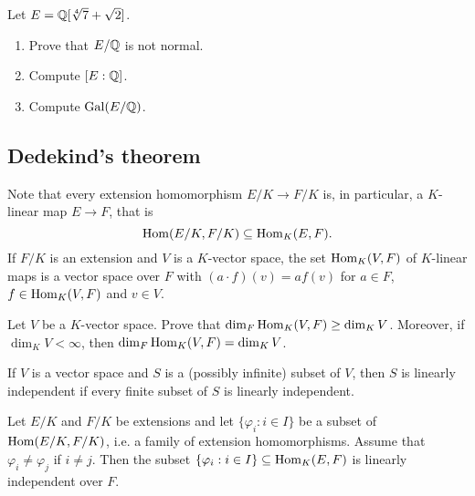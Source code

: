 \begin{exercise}
\label{xca:Q[sqrt[4]{7}+sqrt{2}]}
    Let $E=\mathbb{Q}[\sqrt[4]{7}+\sqrt{2}]$. 
    \begin{enumerate}
        \item Prove that $E/\mathbb{Q}$ is not normal. 
        \item Compute $[E:\mathbb{Q}]$.
        \item Compute $\operatorname{Gal}(E/\mathbb{Q})$. 
    \end{enumerate}
\end{exercise}


\subsection{Dedekind's theorem}

Note that every extension homomorphism $E/K\to F/K$ is, in particular, 
a $K$-linear map $E\to F$, that is
\[
\operatorname{Hom}(E/K,F/K)\subseteq\operatorname{Hom}_K(E,F).
\]
If $F/K$ is an extension and $V$ 
is a $K$-vector space, the set
$\operatorname{Hom}_K(V,F)$ of $K$-linear maps
is a vector space over $F$ with
$(a\cdot f)(v)=af(v)$ for $a\in F$, 
$f\in\operatorname{Hom}_K(V,F)$ and $v\in V$. 

\begin{exercise}
\label{xca:dim}
    Let $V$ be a $K$-vector space. 
    Prove that $\dim_F\operatorname{Hom}_K(V,F)\geq\dim_KV$. Moreover, if 
     $\dim_KV<\infty$, then $\dim_F\operatorname{Hom}_K(V,F)=\dim_KV$.
\end{exercise}

If $V$ is a vector space and $S$ is a (possibly infinite) subset of $V$, 
then $S$ is linearly independent if every finite subset of $S$ is linearly independent. 

\begin{theorem}[Dedekind]
Let $E/K$ and $F/K$ be extensions and let 
$\{\varphi_i:i\in I\}$ 
be a subset of
$\operatorname{Hom}(E/K,F/K)$, i.e. a 
family of extension homomorphisms. Assume that 
$\varphi_i\ne \varphi_j$ if $i\ne j$. Then 
the subset $\{\varphi_i:i\in I\}\subseteq\operatorname{Hom}_K(E,F)$ 
is linearly independent over $F$. 
\end{theorem}

